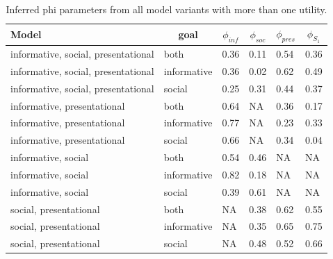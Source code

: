 \documentclass[12pt]{article}
\begin{document}
\begin{table}[tbp]
\begin{center}
\begin{threeparttable}
\caption{\label{tab:phi}Inferred phi parameters from all model variants with more than one utility.}
\begin{tabular}{llllll}
\toprule
Model & \multicolumn{1}{c}{goal} & \multicolumn{1}{c}{$\phi_{inf}$} & \multicolumn{1}{c}{$\phi_{soc}$} & \multicolumn{1}{c}{$\phi_{pres}$} & \multicolumn{1}{c}{$\phi_{S_1}$}\\
\midrule
informative, social, presentational & both & 0.36 & 0.11 & 0.54 & 0.36\\
informative, social, presentational & informative & 0.36 & 0.02 & 0.62 & 0.49\\
informative, social, presentational & social & 0.25 & 0.31 & 0.44 & 0.37\\
informative, presentational & both & 0.64 & NA & 0.36 & 0.17\\
informative, presentational & informative & 0.77 & NA & 0.23 & 0.33\\
informative, presentational & social & 0.66 & NA & 0.34 & 0.04\\
informative, social & both & 0.54 & 0.46 & NA & NA\\
informative, social & informative & 0.82 & 0.18 & NA & NA\\
informative, social & social & 0.39 & 0.61 & NA & NA\\
social, presentational & both & NA & 0.38 & 0.62 & 0.55\\
social, presentational & informative & NA & 0.35 & 0.65 & 0.75\\
social, presentational & social & NA & 0.48 & 0.52 & 0.66\\
\bottomrule
\end{tabular}
\end{threeparttable}
\end{center}
\end{table}
\end{document}
